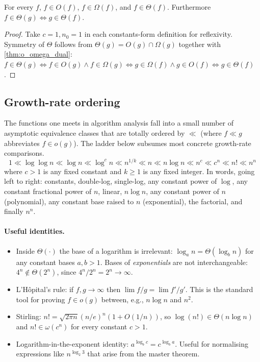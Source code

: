 \begin{corollary}
\label{cor:asymp_reflexive}
For every $f$, $f \in O(f)$, $f \in \Omega(f)$, and $f \in \Theta(f)$. Furthermore $f \in \Theta(g) \iff g \in \Theta(f)$.
\end{corollary}

\begin{proof}
Take $c = 1, n_0 = 1$ in each constants-form definition for reflexivity. Symmetry of $\Theta$ follows from $\Theta(g) = O(g) \cap \Omega(g)$ together with \cref{thm:o_omega_dual}: $f \in \Theta(g) \iff f \in O(g) \wedge f \in \Omega(g) \iff g \in \Omega(f) \wedge g \in O(f) \iff g \in \Theta(f)$.
\end{proof}

\subsection{Growth-rate ordering}

The functions one meets in algorithm analysis fall into a small number of asymptotic equivalence classes that are totally ordered by $\ll$ (where $f \ll g$ abbreviates $f \in o(g)$). The ladder below subsumes most concrete growth-rate comparisons.
\[
  1 \ll \log\log n \ll \log n \ll \log^c n \ll n^{1/k} \ll n \ll n \log n \ll n^c \ll c^n \ll n! \ll n^n
\]
where $c > 1$ is any fixed constant and $k \ge 1$ is any fixed integer. In words, going left to right: constants, double-log, single-log, any constant power of $\log$, any constant fractional power of $n$, linear, $n \log n$, any constant power of $n$ (polynomial), any constant base raised to $n$ (exponential), the factorial, and finally $n^n$.

\paragraph{Useful identities.}
\begin{itemize}
  \item Inside $\Theta(\cdot)$ the base of a logarithm is irrelevant: $\log_a n = \Theta(\log_b n)$ for any constant bases $a, b > 1$. Bases of \emph{exponentials} are not interchangeable: $4^n \notin \Theta(2^n)$, since $4^n / 2^n = 2^n \to \infty$.
  \item L'H\^opital's rule: if $f, g \to \infty$ then $\lim f/g = \lim f'/g'$. This is the standard tool for proving $f \in o(g)$ between, e.g., $n \log n$ and $n^2$.
  \item Stirling: $n! = \sqrt{2\pi n}(n/e)^n (1 + O(1/n))$, so $\log(n!) \in \Theta(n \log n)$ and $n! \in \omega(c^n)$ for every constant $c > 1$.
  \item Logarithm-in-the-exponent identity: $a^{\log_b c} = c^{\log_b a}$. Useful for normalising expressions like $n^{\log_2 3}$ that arise from the master theorem.
\end{itemize}

